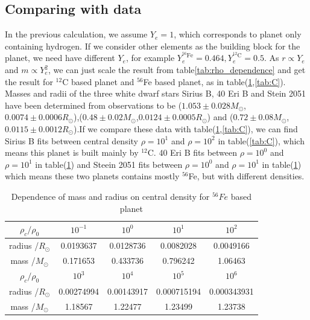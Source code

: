\documentclass{article}
\begin{document}
\subsection{Comparing with data}
In the previous calculation, we assume $Y_e=1$, which corresponds to planet only containing hydrogen. If we consider other elements as the building block for the planet, we need have different $Y_e$, for example $Y_e^{^{56}\text{Fe}}=0.464,Y_e^{^{12}\text{C}}=0.5$. As $r \propto Y_e$ and $m\propto Y_e^2$, we can just scale the result from table{\ref{tab:rho_dependence}} and get the result for $^{12}$C based planet and $^{56}$Fe based planet, as in table(\ref{tab:Fe},\ref{tab:C}). Masses and radii of the three white dwarf stars Sirius B, 40 Eri B and Stein 2051 have been determined from observations to be ($1.053\pm0.028 M_{\odot}$,$0.0074\pm0.0006R_{\odot}$),($0.48\pm0.02M_{\odot}$,$0.0124\pm0.0005R_{\odot}$) and ($0.72\pm0.08M_{\odot}$,$0.0115\pm0.0012R_{\odot}$).If we compare these data with table(\ref{tab:Fe},\ref{tab:C}), we can find Sirius B fits between central density $\rho=10^1$ and $\rho=10^2$ in table(\ref{tab:C}), which means this planet is built mainly by $^{12}$C. 40 Eri B fits between $\rho=10^0$ and $\rho=10^1$ in table(\ref{tab:Fe}) and Steein 2051 fits between $\rho=10^0$ and $\rho=10^1$ in table(\ref{tab:Fe}) which means these two planets contains mostly $^{56}$Fe, but with different densities.
\begin{table}[H]
\centering
\begin{tabular}{|c|c|c|c|c|}
\hline
$\rho_c /\rho_0$& $10^{-1}$& $10^{0}$ & $10^{1}$  & $10^{2}$  \\
\hline
radius /$R_{\odot}$& 0.0193637&  0.0128736&   0.0082028&  0.0049166\\
\hline
mass /$M_{\odot}$& 0.171653&  0.433736&  0.796242&  1.06463\\
\hline
$\rho_c /\rho_0$&  $10^{3}$  & $10^{4}$  & $10^{5}$  & $10^{6}$ \\
\hline
radius /$R_{\odot}$& 0.00274994& 0.00143917& 0.000715194 & 0.000343931\\
\hline
mass /$M_{\odot}$&1.18567&  1.22477&  1.23499 &  1.23738\\
\hline
\end{tabular}
\caption{Dependence of mass and radius on central density for $^{56}Fe$ based planet}
\label{tab:Fe}
\end{table}
\end{document}
